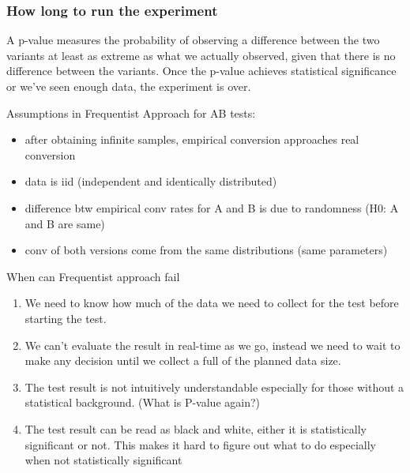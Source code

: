 \documentclass{beamer}
\begin{document}
\begin{frame}\frametitle{How long to run the experiment}
A p-value measures the probability of observing a difference between the two variants at least as extreme as what we actually observed, given that there is no difference between the variants. Once the p-value achieves statistical significance or we’ve seen enough data, the experiment is over.
\end{frame}



\begin{frame}
	Assumptions in Frequentist Approach for AB tests:
	\begin{itemize}
		\item after obtaining infinite samples, empirical conversion approaches real conversion
		\item data is iid (independent and identically distributed)
		\item difference btw empirical conv rates for A and B is due to randomness (H0: A and B are same)
		\item conv of both versions come from the same distributions (same parameters)
	\end{itemize}
	
\end{frame}



\begin{frame}{When can Frequentist approach fail}
	\begin{enumerate}
		\item We need to know how much of the data we need to collect for the test before starting the test.
		\item We can’t evaluate the result in real-time as we go, instead we need to wait to make any decision until we collect a full of the planned data size.
		\item The test result is not intuitively understandable especially for those without a statistical background. (What is P-value again?)
		\item The test result can be read as black and white, either it is statistically significant or not. This makes it hard to figure out what to do especially when not statistically significant
	\end{enumerate}
\end{frame}
\end{document}
